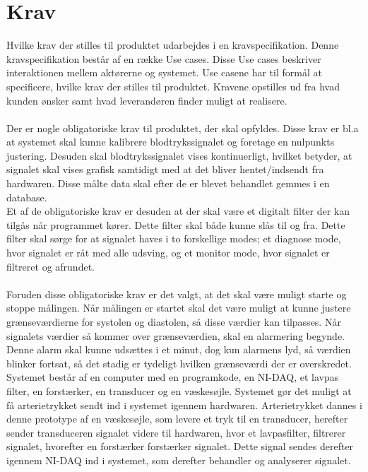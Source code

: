 \chapter{Krav}
Hvilke krav der stilles til produktet udarbejdes i en kravspecifikation. Denne kravspecifikation består af en række Use cases. Disse Use cases beskriver interaktionen mellem aktørerne og systemet. Use casene har til formål at specificere, hvilke krav der stilles til produktet. Kravene opstilles ud fra hvad kunden ønsker samt hvad leverandøren finder muligt at realisere. \\ \\
Der er nogle obligatoriske krav til produktet, der skal opfyldes. Disse krav er bl.a at systemet skal kunne kalibrere blodtrykssignalet og foretage en nulpunkts justering. Desuden skal blodtrykssignalet vises kontinuerligt, hvilket betyder, at signalet skal vises grafisk samtidigt med at det bliver hentet/indsendt fra hardwaren. Disse målte data skal efter de er blevet behandlet gemmes i en database.\\
Et af de obligatoriske krav er desuden at der skal være et digitalt filter der kan tilgås når programmet kører. Dette filter skal både kunne slås til og fra. Dette filter skal sørge for at signalet haves i to forskellige modes; et diagnose mode, hvor signalet er råt med alle udsving, og et monitor mode, hvor signalet er filtreret og afrundet.\\\\
Foruden disse obligatoriske krav er det valgt, at det skal være muligt starte og stoppe målingen. Når målingen er startet skal det være muligt at kunne justere grænseværdierne for systolen og diastolen, så disse værdier kan tilpasses. Når signalets værdier så kommer over grænseværdien, skal en alarmering begynde. Denne alarm skal kunne udsættes i et minut, dog kun alarmens lyd, så værdien blinker fortsat, så det stadig er tydeligt hvilken grænseværdi der er overskredet.\\
Systemet består af en computer med en programkode, en NI-DAQ, et lavpas filter, en forstærker, en transducer og en væskesøjle.
Systemet gør det muligt at få arterietrykket sendt ind i systemet igennem hardwaren. Arterietrykket dannes i denne prototype af en væskesøjle, som levere et tryk til en transducer, herefter sender transduceren signalet videre til hardwaren, hvor et lavpasfilter, filtrerer signalet, hvorefter en forstærker forstærker signalet. Dette signal sendes derefter igennem NI-DAQ ind i systemet, som derefter behandler og analyserer signalet.\\
